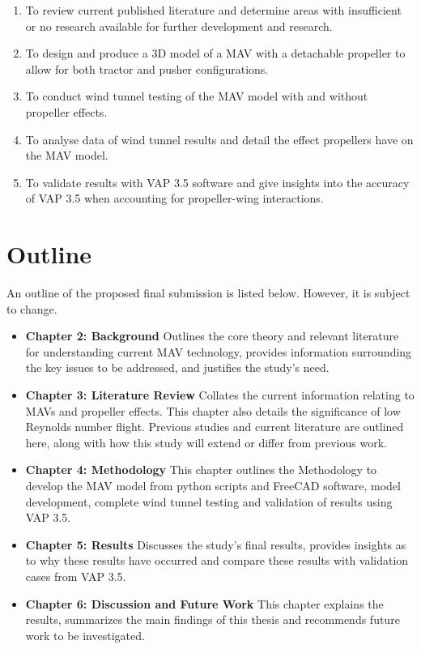 \begin{enumerate}
   \item To review current published literature and determine areas with insufficient or no research available for further development and research.
  \item To design and produce a 3D model of a \acrshort{MAV} with a detachable propeller to allow for both tractor and pusher configurations.
  \item To conduct wind tunnel testing of the \acrshort{MAV} model with and without propeller effects.
  \item To analyse data of wind tunnel results and detail the effect propellers have on the \acrshort{MAV} model.
  \item To validate results with VAP 3.5 software and give insights into the accuracy of VAP 3.5 when accounting for propeller-wing interactions. 
\end{enumerate}

\section{Outline}
\label{sec:Outline}
An outline of the proposed final submission is listed below. However, it is subject to change.

\begin{itemize}
  \item \textbf{Chapter 2: Background }\newline  Outlines the core theory and relevant literature for understanding current \acrshort{MAV} technology, provides information surrounding the key issues to be addressed, and justifies the study's need. 
  \item \textbf{Chapter 3: Literature Review} \newline
  Collates the current information relating to \acrshort{MAV}s and propeller effects. This chapter also details the significance of low Reynolds number flight. Previous studies and current literature are outlined here, along with how this study will extend or differ from previous work.
  \item \textbf{Chapter 4: Methodology} \newline This chapter outlines the Methodology to develop the \acrshort{MAV} model from python scripts and FreeCAD software, model development, complete wind tunnel testing and validation of results using VAP 3.5.
  \item \textbf{Chapter 5: Results} \newline Discusses the study's final results, provides insights as to why these results have occurred and compare these results with validation cases from VAP 3.5.
  \item \textbf{Chapter 6: Discussion and Future Work} \newline This chapter explains the results, summarizes the main findings of this thesis and recommends future work to be investigated. 
\end{itemize}





